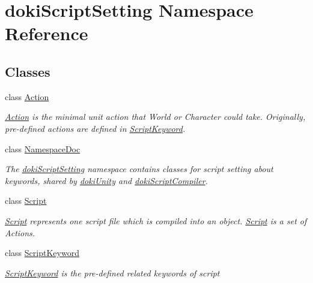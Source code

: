 \hypertarget{namespacedoki_script_setting}{}\section{doki\+Script\+Setting Namespace Reference}
\label{namespacedoki_script_setting}
\subsection*{Classes}
\begin{DoxyCompactItemize}
\item 
class \hyperlink{classdoki_script_setting_1_1_action}{Action}
\begin{DoxyCompactList}\small\item\em \hyperlink{classdoki_script_setting_1_1_action}{Action} is the minimal unit action that World or Character could take. Originally, pre-\/defined actions are defined in \hyperlink{classdoki_script_setting_1_1_script_keyword}{Script\+Keyword}. \end{DoxyCompactList}\item 
class \hyperlink{classdoki_script_setting_1_1_namespace_doc}{Namespace\+Doc}
\begin{DoxyCompactList}\small\item\em The \hyperlink{namespacedoki_script_setting}{doki\+Script\+Setting} namespace contains classes for script setting about keywords, shared by \hyperlink{namespacedoki_unity}{doki\+Unity} and \hyperlink{namespacedoki_script_compiler}{doki\+Script\+Compiler}. \end{DoxyCompactList}\item 
class \hyperlink{classdoki_script_setting_1_1_script}{Script}
\begin{DoxyCompactList}\small\item\em \hyperlink{classdoki_script_setting_1_1_script}{Script} represents one script file which is compiled into an object. \hyperlink{classdoki_script_setting_1_1_script}{Script} is a set of Actions. \end{DoxyCompactList}\item 
class \hyperlink{classdoki_script_setting_1_1_script_keyword}{Script\+Keyword}
\begin{DoxyCompactList}\small\item\em \hyperlink{classdoki_script_setting_1_1_script_keyword}{Script\+Keyword} is the pre-\/defined related keywords of script \end{DoxyCompactList}\end{DoxyCompactItemize}
